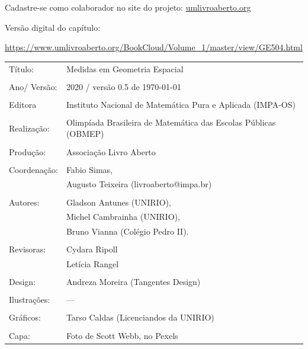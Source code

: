 Cadastre-se como colaborador no site do projeto: \url{umlivroaberto.org}

Versão digital do capítulo:

\url{https://www.umlivroaberto.org/BookCloud/Volume_1/master/view/GE504.html}


\begin{tabular}{p{}p{}}
Título: & Medidas em Geometria Espacial\\
\\
Ano/ Versão: & 2020 / versão 0.5 de \today\\
\\
Editora & Instituto Nacional de Matem\'atica Pura e Aplicada (IMPA-OS)\\
\\
Realização:& Olimp\'iada Brasileira de Matem\'atica das Escolas P\'ublicas (OBMEP)\\
\\
Produção:& Associação Livro Aberto\\
\\
Coordenação:& Fabio Simas, \\
   			& Augusto Teixeira (livroaberto@impa.br)\\
\\
Autores: & Gladson Antunes (UNIRIO),\\
         & Michel Cambrainha (UNIRIO),\\
         & Bruno Vianna (Colégio Pedro II).\\
\\
Revisoras: &  Cydara Ripoll  \\
           &  Letícia Rangel \\
\\
Design: & Andreza Moreira (Tangentes Design) \\
\\
  Ilustrações: & --- \\ 
\\
Gráficos: & Tarso Caldas (Licenciandos da UNIRIO)\\
\\
  Capa: & Foto de Scott Webb, no Pexels \\

\end{tabular}



